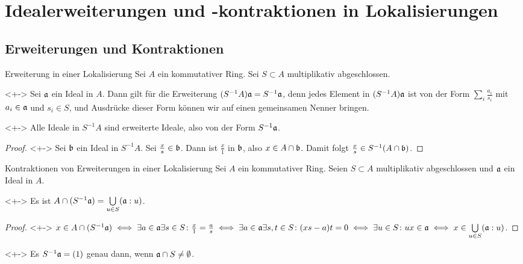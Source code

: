 \section{Idealerweiterungen und -kontraktionen in Lokalisierungen}

\subsection{Erweiterungen und Kontraktionen}

\begin{frame}{Erweiterung in einer Lokalisierung}
	Sei \(A\) ein kommutativer Ring. Sei \(S \subset A\) multiplikativ abgeschlossen.
	\begin{example}<+->
		Sei \(\mathfrak{a}\) ein Ideal in \(A\).
		Dann gilt für die Erweiterung \((S^{-1} A) \mathfrak{a} = S^{-1} \mathfrak{a}\), denn jedes Element in \((S^{-1} A) \mathfrak{a}\) ist
		von der Form \(\sum_i \frac {a_i}{s_i}\) mit \(a_i \in \mathfrak{a}\) und \(s_i \in S\), und Ausdrücke dieser Form
		können wir auf einen gemeinsamen Nenner bringen.
	\end{example}
	\begin{proposition}<+->
		Alle Ideale in \(S^{-1} A\) sind erweiterte Ideale, also von der Form \(S^{-1} \mathfrak{a}\).
	\end{proposition}
	\begin{proof}<+->
		Sei \(\mathfrak{b}\) ein Ideal in \(S^{-1} A\). Sei \(\frac x s \in \mathfrak{b}\). Dann ist \(\frac x 1\) in \(\mathfrak{b}\),
		also \(x \in A \cap \mathfrak{b}\). Damit folgt \(\frac x s \in S^{-1}(A \cap \mathfrak{b})\).
	\end{proof}
\end{frame}

\begin{frame}{Kontraktionen von Erweiterungen in einer Lokalisierung}
	Sei \(A\) ein kommutativer Ring. Seien \(S \subset A\) multiplikativ abgeschlossen und \(\mathfrak{a}\) ein Ideal in \(A\).
	\begin{proposition}<+->
		Es ist \(A \cap (S^{-1} \mathfrak{a}) = \bigcup\limits_{u \in S} (\mathfrak{a} : u)\). 
	\end{proposition}
	\begin{proof}<+->
		\(x \in A \cap (S^{-1} \mathfrak{a}) \iff \exists a \in \mathfrak{a} \exists s \in S \colon \frac x 1 = \frac a s
		\iff \exists a \in \mathfrak{a} \exists s, t \in S \colon (x s - a) t = 0 \iff \exists u \in S\colon
		ux \in \mathfrak{a} \iff x \in \bigcup\limits_{u \in S} (\mathfrak{a} : u)\).
	\end{proof}	
	\begin{example}<+->
		Es \(S^{-1} \mathfrak{a} = (1)\) genau dann, wenn \(\mathfrak{a} \cap S \neq \emptyset\).
	\end{example}
\end{frame}
	
